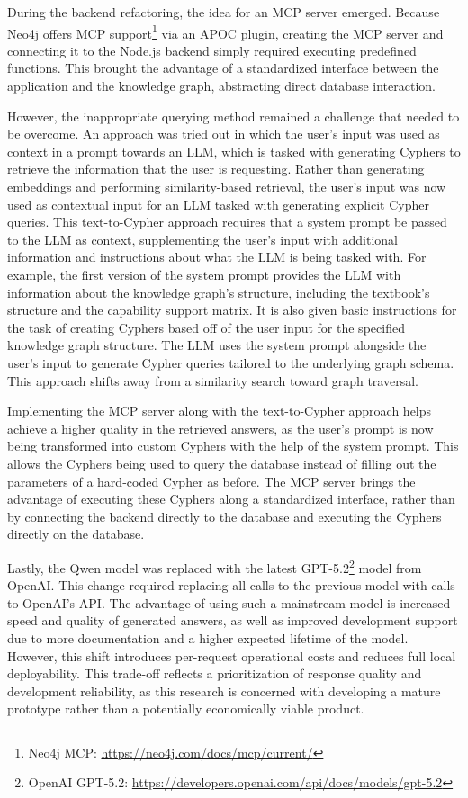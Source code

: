 During the backend refactoring, the idea for an MCP server emerged. Because Neo4j offers MCP support\footnote{Neo4j MCP: \url{https://neo4j.com/docs/mcp/current/}} via an APOC plugin, creating the MCP server and connecting it to the Node.js backend simply required executing predefined functions. This brought the advantage of a standardized interface between the application and the knowledge graph, abstracting direct database interaction.

However, the inappropriate querying method remained a challenge that needed to be overcome. An approach was tried out in which the user's input was used as context in a prompt towards an LLM, which is tasked with generating Cyphers to retrieve the information that the user is requesting. Rather than generating embeddings and performing similarity-based retrieval, the user's input was now used as contextual input for an LLM tasked with generating explicit Cypher queries. This text-to-Cypher approach requires that a system prompt be passed to the LLM as context, supplementing the user's input with additional information and instructions about what the LLM is being tasked with. For example, the first version of the system prompt provides the LLM with information about the knowledge graph's structure, including the textbook's structure and the capability support matrix. It is also given basic instructions for the task of creating Cyphers based off of the user input for the specified knowledge graph structure. The LLM uses the system prompt alongside the user's input to generate Cypher queries tailored to the underlying graph schema. This approach shifts away from a similarity search toward graph traversal.

Implementing the MCP server along with the text-to-Cypher approach helps achieve a higher quality in the retrieved answers, as the user's prompt is now being transformed into custom Cyphers with the help of the system prompt. This allows the Cyphers being used to query the database instead of filling out the parameters of a hard-coded Cypher as before. The MCP server brings the advantage of executing these Cyphers along a standardized interface, rather than by connecting the backend directly to the database and executing the Cyphers directly on the database.

Lastly, the Qwen model was replaced with the latest GPT-5.2\footnote{OpenAI GPT-5.2: \url{https://developers.openai.com/api/docs/models/gpt-5.2}} model from OpenAI. This change required replacing all calls to the previous model with calls to OpenAI's API. The advantage of using such a mainstream model is increased speed and quality of generated answers, as well as improved development support due to more documentation and a higher expected lifetime of the model. However, this shift introduces per-request operational costs and reduces full local deployability. This trade-off reflects a prioritization of response quality and development reliability, as this research is concerned with developing a mature prototype rather than a potentially economically viable product.

